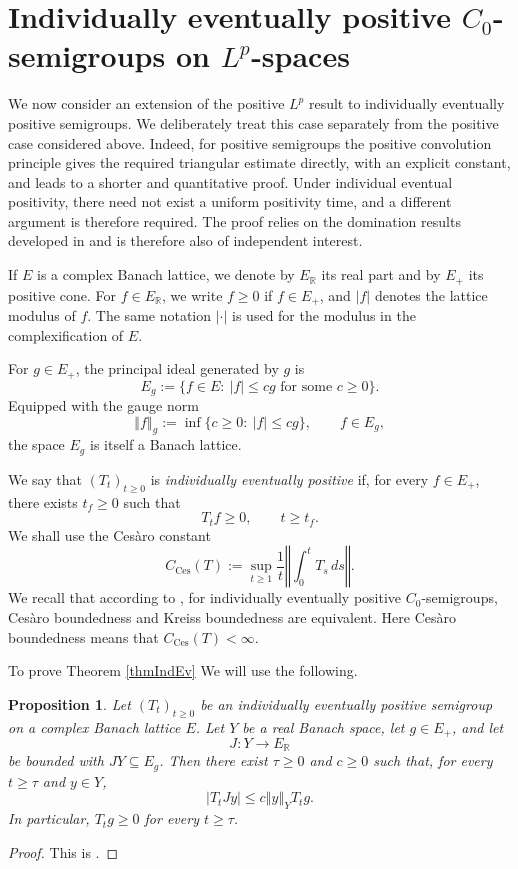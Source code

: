 \documentclass[12pt]{amsart}
\theoremstyle{plain}
\newtheorem{prop}[thm]{Proposition}
\theoremstyle{remark}
\theoremstyle{definition}
\newcommand{\R}{\mathbb{R}}
\newcommand{\norm}[1]{\left\Vert #1\right\Vert}
\begin{document}
	\section{Individually eventually positive $C_0$-semigroups on $L^p$-spaces}\label{secIndividual}
	
	We now consider an extension of the positive $L^p$ result to individually eventually positive semigroups. We deliberately treat this case separately from the positive case considered above. Indeed, for positive semigroups the positive convolution principle gives the required triangular estimate directly, 
	with an explicit constant, and leads to a shorter and quantitative proof. Under individual eventual positivity, there need not exist a uniform positivity time, and a different argument is therefore required. The proof relies on the domination results developed in
	\cite{ArnoldStability} and is therefore also of independent interest.
	
	
	
	If $E$ is a complex Banach lattice, we denote by $E_{\mathbb R}$
	its real part and by $E_+ $ its positive cone. For $f\in E_{\mathbb R}$,
	we write $f\ge0$ if $f\in E_+$, and $|f|$ denotes the lattice modulus of
	$f$. The same notation $|\cdot|$ is used for the modulus in the
	complexification of $E$.
	
	For $g\in E_+$, the principal ideal generated by $g$ is
	\[
	E_g
	:=
	\{f\in E:\ |f|\le c g
	\text{ for some }c\ge0\}.
	\]
	Equipped with the gauge norm
	\[
	\norm{f}_g
	:=
	\inf\{c\ge0:\ |f|\le c g\},
	\qquad f\in E_g,
	\]
	the space $E_g$ is itself a Banach lattice.
	
	We say that $(T_t)_{t\ge0}$ is \emph{individually eventually positive} if, for every $f\in E_+$, there exists $t_f\ge0$ such that \[ T_tf\ge0,\qquad t\ge t_f. \] We shall use the Ces\`aro constant 
	\[ C_{\mathrm{Ces}}(T) := \sup_{t\ge1} \frac1t\norm{\int_0^tT_s\,ds}. \]
	We recall that according to \cite[Proposition 2.6]{ArnoldCoine2023}, for individually 
	eventually positive $C_0$-semigroups, Cesàro boundedness and Kreiss boundedness are equivalent. Here Ces\`aro boundedness means that $C_{\mathrm{Ces}}(T) < \infty$. 
	
	To prove Theorem \ref{thmIndEv}
	We will use the following. 
	
	\begin{prop}\label{propIndividualDomination}
		Let $(T_t)_{t\ge0}$ be an individually eventually positive semigroup on a
		complex Banach lattice $E$. Let $Y$ be a real Banach space, let $g\in E_+$,
		and let
		\[
		J:Y\longrightarrow E_{\R}
		\]
		be bounded with $JY\subseteq E_g$. Then there exist $\tau\ge0$ and $c\ge0$
		such that, for every $t\ge\tau$ and $y\in Y$,
		\[
		|T_tJy|
		\le
		c\norm{y}_Y T_tg.
		\]
		In particular, $T_tg\ge0$ for every $t\ge\tau$.
	\end{prop} 
	\begin{proof} This is \cite[Corollary 2.2]{ArnoldStability}. \end{proof}
	
\end{document}
